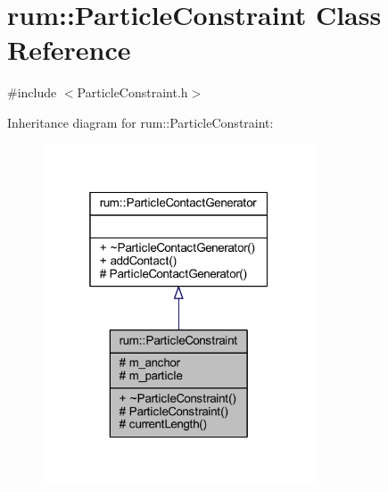 \hypertarget{classrum_1_1_particle_constraint}{}\section{rum\+:\+:Particle\+Constraint Class Reference}
\label{classrum_1_1_particle_constraint}


{\ttfamily \#include $<$Particle\+Constraint.\+h$>$}



Inheritance diagram for rum\+:\+:Particle\+Constraint\+:\nopagebreak
\begin{figure}[H]
\begin{center}
\leavevmode
\includegraphics[width=229pt]{classrum_1_1_particle_constraint__inherit__graph}
\end{center}
\end{figure}


